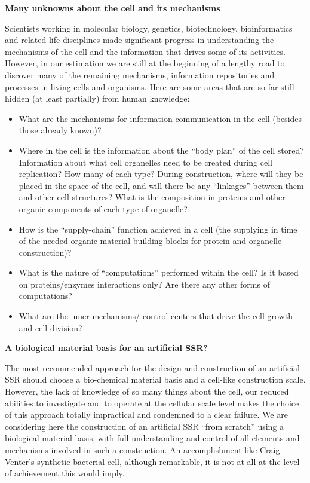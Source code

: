 \bigskip

\textbf{Many unknowns about the cell and its mechanisms}


\bigskip

Scientists working in molecular biology, genetics, biotechnology,
bioinformatics and related life disciplines made significant progress
in understanding the mechanisms of the cell and the information that
drives some of its activities. However, in our estimation we are still
at the beginning of a lengthy road to discover many of the remaining
mechanisms, information repositories and processes in living cells and
organisms. Here are some areas that are so far still hidden (at least
partially) from human knowledge:


\bigskip

\begin{itemize}
\item What are the mechanisms for information communication in the cell
(besides those already known)?
\item Where in the cell is the information about the “body plan” of the
cell stored? Information about what cell organelles need to be created
during cell replication? How many of each type? During construction,
where will they be placed in the space of the cell, and will there be
any “linkages” between them and other cell structures? What is the
composition in proteins and other organic components of each type of
organelle?
\item How is the “supply-chain” function achieved in a cell (the
supplying in time of the needed organic material building blocks for
protein and organelle construction)?
\item What is the nature of “computations” performed within the cell? Is
it based on proteins/enzymes interactions only? Are there any other
forms of computations?
\item What are the inner mechanisms/ control centers that drive the cell
growth and cell division?
\end{itemize}

\bigskip

\textbf{A biological material basis for an artificial SSR?}


\bigskip

The most recommended approach for the design and construction of an
artificial SSR should choose a bio-chemical material basis and a
cell-like construction scale. However, the lack of knowledge of so many
things about the cell, our reduced abilities to investigate and to
operate at the cellular scale level makes the choice of this approach
totally impractical and condemned to a clear failure. We are
considering here the construction of an artificial SSR “from scratch”
using a biological material basis, with full understanding and control
of all elements and mechanisms involved in such a construction. An
accomplishment like Craig Venter’s synthetic bacterial cell, although
remarkable, it is not at all at the level of achievement this would
imply.



